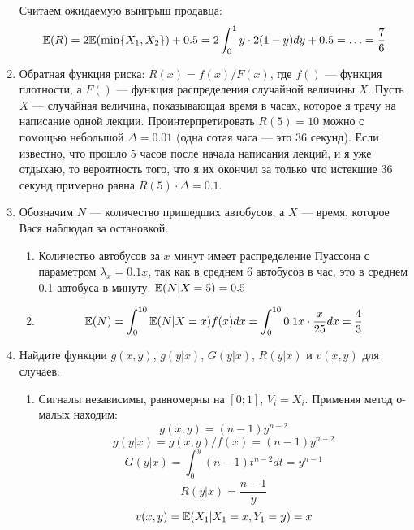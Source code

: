 \begin{enumerate}
Считаем ожидаемую выигрыш продавца:
\begin{equation}
\mathbb{E}(R)=2\mathbb{E}(\min\{X_{1},X_{2}\})+0.5=2\int_{0}^{1}y\cdot 2(1-y)dy+0.5=\ldots=\frac{7}{6}
\end{equation}


\item Обратная функция риска: $ R(x)=f(x)/F(x) $, где $ f() $ — функция плотности, а $ F() $ — функция распределения случайной величины $ X $. Пусть $ X $ — случайная величина, показывающая время в часах, которое я трачу на написание одной лекции. Проинтерпретировать $ R(5)=10 $ можно с помощью небольшой $ \Delta=0.01 $ (одна сотая часа — это 36 секунд). Если известно, что прошло 5 часов после начала написания лекций, и я уже отдыхаю, то вероятность того, что я их окончил за только что истекшие 36 секунд примерно равна $ R(5)\cdot \Delta=0.1 $.
\item Обозначим $ N$ — количество пришедших автобусов, а $ X $ — время, которое Вася наблюдал за остановкой.
\begin{enumerate}
\item Количество автобусов за $ x $ минут имеет распределение Пуассона с параметром $ \lambda_{x}=0.1x $, так как в среднем 6 автобусов в час, это в среднем 0.1 автобуса в минуту. $ \mathbb{E}(N|X=5)=0.5 $
\item \begin{equation} \mathbb{E}(N)=\int_{0}^{10}\mathbb{E}(N|X=x)f(x)dx=\int_{0}^{10}0.1x\cdot \frac{x}{25} dx=\frac{4}{3} \end{equation}
\end{enumerate}
\item Найдите функции $ g(x,y)$, $ g(y|x)$, $ G(y|x)$,  $R(y|x)$ и $v(x,y)$ для случаев:
\begin{enumerate}
\item Сигналы независимы, равномерны на $ [0;1] $, $ V_{i}=X_{i} $.
Применяя метод о-малых находим:
\begin{equation}
g(x,y)=(n-1)y^{n-2}
\end{equation}
\begin{equation}
g(y|x)=g(x,y)/f(x)=(n-1)y^{n-2}
\end{equation}
\begin{equation}
G(y|x)=\int_{0}^{y}(n-1)t^{n-2}dt=y^{n-1}
\end{equation}
\begin{equation}
R(y|x)=\frac{n-1}{y}
\end{equation}
\begin{equation}
v(x,y)=\mathbb{E}(X_{1}|X_{1}=x,Y_{1}=y)=x
\end{equation}


\end{enumerate}
\end{enumerate}
